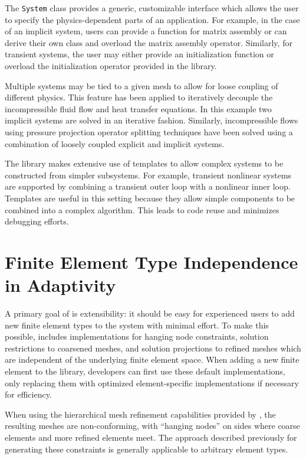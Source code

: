 The \texttt{System} class provides a generic, customizable interface
which allows the user to specify the physics-dependent parts of an
application.  For example, in the case of an implicit system, users can
provide a function for matrix assembly or can derive their own class
and overload the matrix assembly operator.  Similarly, for transient
systems, the user may either provide an initialization function or
overload the initialization operator provided in the library.

Multiple systems may be tied to a given mesh to allow for loose
coupling of different physics.  This feature has been applied to
iteratively decouple the incompressible fluid flow and heat transfer
equations.  In this example two implicit systems are solved in an
iterative fashion.  Similarly, incompressible flows using pressure
projection operator splitting techniques have been solved using a
combination of loosely coupled explicit and implicit systems.

The library makes extensive use of \cpp{} templates to allow
complex systems to be constructed from simpler subsystems.  For
example, transient nonlinear systems are supported by combining a
transient outer loop with a nonlinear inner loop.  Templates are
useful in this setting because they allow simple components to be
combined into a complex algorithm. This leads to code reuse and
minimizes debugging efforts.


\section{Finite Element Type Independence in Adaptivity\label{sec:element_independent_amr}}

A primary goal of \libMesh{} is extensibility: it should be easy for
experienced users to add new finite element types to the system with
minimal effort.  To make this possible, \libMesh{} includes
implementations for hanging node constraints,
solution restrictions to coarsened meshes, and solution projections to
refined meshes which are independent of the underlying finite element space.  When adding a new finite element to the library, developers
can first use these default implementations, only replacing them with
optimized element-specific implementations if necessary for
efficiency.

When using the hierarchical mesh refinement capabilities provided by
\libMesh, the resulting meshes are non-conforming, with ``hanging
nodes'' on sides where coarse elements and more refined elements meet.
The approach described previously for generating these constraints is generally applicable to arbitrary element types.

